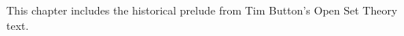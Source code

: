 \documentclass[../../../include/open-logic-chapter]{subfiles}
\begin{document}
	

\begin{editorial}
This chapter includes the historical prelude from Tim Button's Open
Set Theory text.
\end{editorial}






\end{document}
